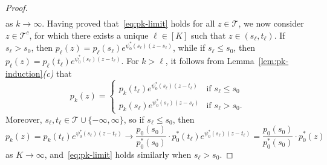 \documentclass[10pt,a4paper]{amsart}
\begin{document}
\begin{proof}
\begin{align*}
\end{align*}
as $k \to \infty$. Having proved that~\eqref{eq:pk-limit} holds for all $z \in \mathcal{T}$, we now consider $z \in \mathcal{T}^c$, for which there exists a unique $\ell \in [K]$ such that $z \in (s_\ell,t_\ell)$. If $s_\ell > s_0$, then $p_\ell(z) = p_\ell(s_\ell)e^{\psi_0^*(s_\ell)(z - s_\ell)}$, while if $s_\ell \leq s_0$, then $p_\ell(z) = p_\ell(t_\ell)e^{\psi_0^*(s_\ell)(z - t_\ell)}$.
For $k > \ell$, it follows from Lemma~\ref{lem:pk-induction}\textit{(c)} that
\[
p_k(z) = 
\begin{cases}
p_k(t_\ell)e^{\psi_0^*(s_\ell)(z - t_\ell)} &\text{if }s_\ell \leq s_0 \\
p_k(s_\ell)e^{\psi_0^*(s_\ell)(z - s_\ell)} &\text{if }s_\ell > s_0.
\end{cases}
\]
Moreover, $s_\ell,t_\ell \in \mathcal{T} \cup \{-\infty,\infty\}$, so if $s_\ell \leq s_0$, then
\[
p_k(z) = p_k(t_\ell)e^{\psi_0^*(s_\ell)(z - t_\ell)} \to \frac{p_0(s_0)}{p_0^*(s_0)} \cdot p_0^*(t_\ell)e^{\psi_0^*(s_\ell)(z - t_\ell)} = \frac{p_0(s_0)}{p_0^*(s_0)} \cdot p_0^*(z)
\]
as $K \to \infty$, and~\eqref{eq:pk-limit} holds similarly when $s_\ell > s_0$.


\end{proof}
\end{document}
